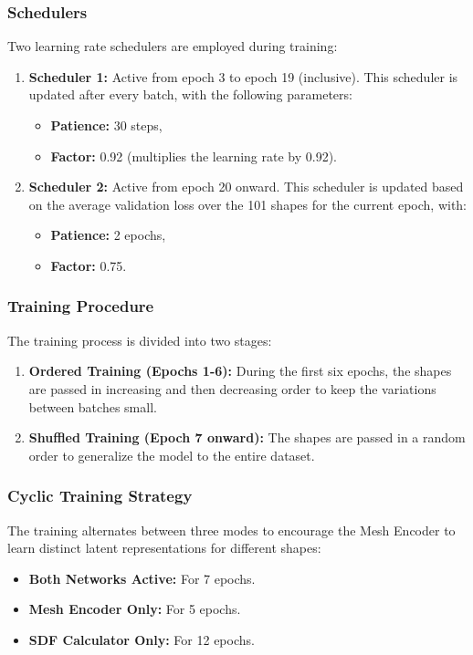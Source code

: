 \documentclass[a4paper,12pt]{article}
\begin{document}
\subsubsection*{Schedulers}
Two learning rate schedulers are employed during training:
\begin{enumerate}
	\item \textbf{Scheduler 1:} Active from epoch 3 to epoch 19 (inclusive). This scheduler is updated after every batch, with the following parameters:
	      \begin{itemize}
		      \item \textbf{Patience:} 30 steps,
		      \item \textbf{Factor:} 0.92 (multiplies the learning rate by 0.92).
	      \end{itemize}
	\item \textbf{Scheduler 2:} Active from epoch 20 onward. This scheduler is updated based on the average validation loss over the 101 shapes for the current epoch, with:
	      \begin{itemize}
		      \item \textbf{Patience:} 2 epochs,
		      \item \textbf{Factor:} 0.75.
	      \end{itemize}
\end{enumerate}

\subsubsection*{Training Procedure}
The training process is divided into two stages:
\begin{enumerate}
	\item \textbf{Ordered Training (Epochs 1-6):} During the first six epochs, the shapes are passed in increasing and then decreasing order to keep the variations between batches small.
	\item \textbf{Shuffled Training (Epoch 7 onward):} The shapes are passed in a random order to generalize the model to the entire dataset.
\end{enumerate}

\subsubsection*{Cyclic Training Strategy}
The training alternates between three modes to encourage the Mesh Encoder to learn distinct latent representations for different shapes:
\begin{itemize}
	\item \textbf{Both Networks Active:} For 7 epochs.
	\item \textbf{Mesh Encoder Only:} For 5 epochs.
	\item \textbf{SDF Calculator Only:} For 12 epochs.
\end{itemize}
\end{document}
